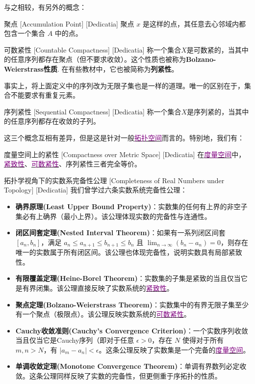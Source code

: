 \documentclass[UTF8]{ctexart}
\newcommand{\hyperrefc}[2]{\hyperref[#1]{\textcolor{purple}{#2}}}
\begin{document}
与之相较，有另外的概念：
\begin{dfn}
    [UUID]
    {聚点}
    [Accumulation Point]
    [Dedicatia]
    聚点 \( x \) 是这样的点，其任意去心邻域内都包含一个集合 \( A \) 中的点。
\end{dfn}
\begin{dfn}
    [CountableCompactness]
    {可数紧性}
    [Countable Compactness]
    [Dedicatia]
    称一个集合$X$是可数紧的，当其中的任意序列都存在聚点（但不要求收敛）。这个性质也被称为\textbf{Bolzano-Weierstrass性质}. 在有些教材中，它也被简称为\textbf{列紧性}。
\end{dfn}
事实上，将上面定义中的序列改为无限子集也是一样的道理。唯一的区别在于，集合不能要求有重复元素。
\begin{dfn}
    [UUID]
    {序列紧性}
    [Sequential Compactness]
    [Dedicatia]
    称一个集合$X$是序列紧的，当其中的任意序列都存在收敛的子列。
\end{dfn}
这三个概念互相有差异，但是这是针对一般\hyperrefc{dfn:TopologicalSpace}{拓扑空间}而言的。特别地，我们有：
\begin{thm}
    [UUID]
    {度量空间上的紧性}
    [Compactness over Metric Space]
    [Dedicatia]
    在\hyperrefc{dfn:MetricSpace}{度量空间}中，\hyperrefc{dfn:Compactness}{紧致性}、\hyperrefc{dfn:CountableCompactness}{可数紧性}、序列紧性三者完全等价。
\end{thm}
\begin{xmp}
    [UUID]
    {拓扑学视角下的实数系完备性公理}
    [Completeness of Real Numbers under Topology]
    [Dedicatia]
    我们曾学过六条实数系统完备性公理：
    \begin{itemize}
        \item \textbf{确界原理(Least Upper Bound Property)}：实数集的任何有上界的非空子集必有上确界（最小上界）。该公理体现实数的完备性与连通性。
        \item \textbf{闭区间套定理(Nested Interval Theorem)}：如果有一系列闭区间套 \([a_n, b_n]\)，满足 \(a_n \leq a_{n+1} \leq b_{n+1} \leq b_n\) 且 \(\lim_{n \to \infty} (b_n - a_n) = 0\)，则存在唯一的实数属于所有闭区间。该公理也体现完备性，说明实数具有局部紧致性。
        \item \textbf{有限覆盖定理(Heine-Borel Theorem)}：实数集的子集是紧致的当且仅当它是有界闭集。该公理直接反映了实数系统的\hyperrefc{dfn:Compactness}{紧致性}。
        \item \textbf{聚点定理(Bolzano-Weierstrass Theorem)}：实数集中的有界无限子集至少有一个聚点（极限点）。该公理反映实数系统的\hyperrefc{dfn:CountableCompactness}{可数紧性}。
        \item \textbf{Cauchy收敛准则(Cauchy's Convergence Criterion)}：一个实数序列收敛当且仅当它是Cauchy序列（即对于任意 \(\epsilon > 0\)，存在 \(N\) 使得对于所有 \(m, n > N\)，有 \(|a_m - a_n| < \epsilon\)。这条公理反映了实数集是一个完备的\hyperrefc{dfn:MetricSpace}{度量空间}。
        \item \textbf{单调收敛定理(Monotone Convergence Theorem)}：单调有界数列必定收敛。这条公理同样反映了实数的完备性，但更侧重于序拓扑的性质。
    \end{itemize}
\end{xmp}
\end{document}
